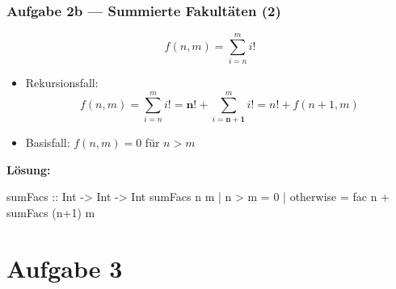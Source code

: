 \documentclass{beamer}
\begin{document}
	\begin{frame}[fragile] \frametitle{Aufgabe 2b --- Summierte Fakultäten (2)}
		\footnotesize
		\begin{equation*}
			f(n,m) = \sum_{i=n}^{m} i!
		\end{equation*}
		\pause
		\begin{itemize}[leftmargin=*]
			\item Rekursionsfall: 
			\begin{equation*}
				f(n,m) = \sum_{i=n}^{m} i! = \boldsymbol{n}! + \sum_{i=\boldsymbol{n+1}}^{m} i! = n! + f(n+1,m) 
			\end{equation*}
			\item Basisfall: $f(n,m) = 0$ für $n > m$
		\end{itemize}
		\pause
		
		\textbf{Lösung:} \\[0.5em]
		\begin{codebox}
sumFacs :: Int -> Int -> Int
sumFacs n m
	| n > m = 0
	| otherwise = fac n + sumFacs (n+1) m
		\end{codebox}
	\end{frame}


	\section{Aufgabe 3}
	
\end{document}
